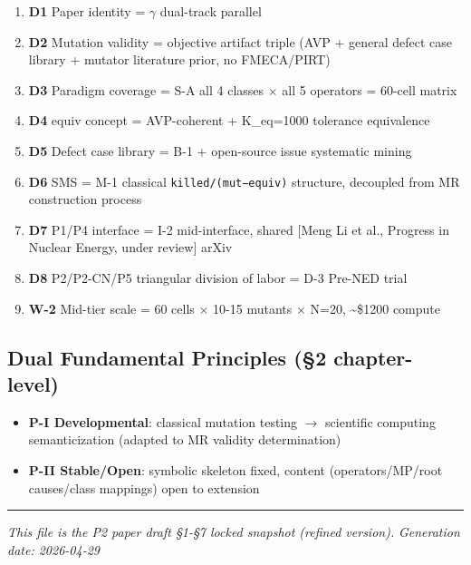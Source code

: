 \documentclass[review,12pt,authoryear]{elsarticle}
\providecommand{\tightlist}{\setlength{\itemsep}{0pt}\setlength{\parskip}{0pt}}
\begin{document}
\begin{enumerate}
\def\labelenumi{\arabic{enumi}.}
\tightlist
\item
  \textbf{D1} Paper identity = $\gamma$ dual-track parallel
\item
  \textbf{D2} Mutation validity = objective artifact triple (AVP +
  general defect case library + mutator literature prior, no FMECA/PIRT)
\item
  \textbf{D3} Paradigm coverage = S-A all 4 classes $\times$ all 5 operators =
  60-cell matrix
\item
  \textbf{D4} equiv concept = AVP-coherent + K\_eq=1000 tolerance
  equivalence
\item
  \textbf{D5} Defect case library = B-1 + open-source issue systematic
  mining
\item
  \textbf{D6} SMS = M-1 classical \texttt{killed/(mut−equiv)} structure,
  decoupled from MR construction process
\item
  \textbf{D7} P1/P4 interface = I-2 mid-interface, shared {[}Meng Li et
  al., Progress in Nuclear Energy, under review{]} arXiv
\item
  \textbf{D8} P2/P2-CN/P5 triangular division of labor = D-3 Pre-NED
  trial
\item
  \textbf{W-2} Mid-tier scale = 60 cells $\times$ 10-15 mutants $\times$ N=20,
  \textasciitilde\$1200 compute
\end{enumerate}

\subsection{Dual Fundamental Principles (§2
chapter-level)}\label{dual-fundamental-principles-2-chapter-level}

\begin{itemize}
\tightlist
\item
  \textbf{P-I Developmental}: classical mutation testing $\to$ scientific
  computing semanticization (adapted to MR validity determination)
\item
  \textbf{P-II Stable/Open}: symbolic skeleton fixed, content
  (operators/MP/root causes/class mappings) open to extension
\end{itemize}

\begin{center}\rule{0.5\linewidth}{0.5pt}\end{center}

\emph{This file is the P2 paper draft §1-§7 locked snapshot (refined
version).} \emph{Generation date: 2026-04-29}
\end{document}
